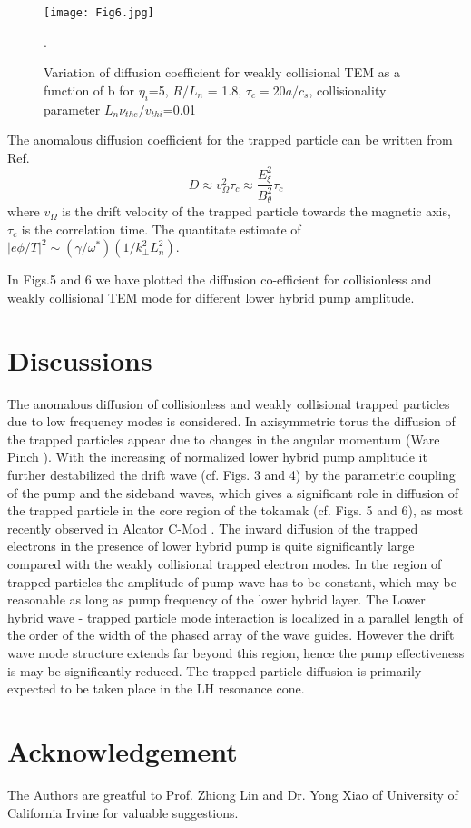 \documentclass[aip,pop,amsmath,amssymb,showpacs,reprint,floatfix,lengthcheck]{revtex4-1}
\begin{document}
\begin{figure}
 \centering
 \texttt{[image: Fig6.jpg]}
 \caption{Variation of diffusion coefficient for weakly collisional TEM as a function of b for $\eta_{i}$=5, $R/L_{n}$ = 1.8, $\tau_{c}=20a/c_{s}$, collisionality parameter $L_{n}\nu_{the}/v_{thi}$=0.01}.
 \label{fig:6}
\end{figure}
The anomalous diffusion coefficient for the trapped particle can be written from Ref. \cite{PhysRevLett.26.621}
\begin{equation}
 D \approx  v_{\Omega}^2\tau_{c} \approx\frac{E_{\xi}^2}{B_{\theta}^2}\tau_{c}
\end{equation}
where $v_{\Omega}$ is the drift velocity of the trapped particle towards the magnetic axis, $\tau_{c}$ is the correlation time. The quantitate estimate of $\lvert {e\phi}/{T}\rvert^2 \sim ({\gamma}/{\omega^*})({1}/{k_{\perp}^2L_{n}^2})$.

In Figs.5 and 6 we have plotted the diffusion co-efficient for collisionless and weakly collisional TEM mode for different lower hybrid pump amplitude.
\section{Discussions}
 The anomalous diffusion of collisionless and weakly collisional trapped particles  due to low frequency modes is considered. In axisymmetric torus the diffusion of the trapped particles appear due to changes in the angular momentum (Ware Pinch \cite{PhysRevLett.25.15}). With the increasing of normalized lower hybrid pump amplitude it further destabilized the drift wave (cf. Figs. 3 and 4) by the parametric coupling of the pump and the sideband waves, which gives a significant role in diffusion of the trapped particle in the core region of the tokamak (cf. Figs. 5 and 6), as most recently observed in Alcator C-Mod \cite{PhysRevLett.102.035002,rice2009observations}. The inward diffusion of the trapped electrons in the presence of lower hybrid pump is quite significantly large compared with the weakly collisional trapped electron modes.
In the region of trapped particles the amplitude of pump wave has to be constant, which may be reasonable as long as pump frequency of the lower hybrid layer. The Lower hybrid wave - trapped particle mode interaction is localized in a parallel length of the order of the width of the phased array of the wave guides. However the drift wave mode structure extends far beyond this region, hence the pump effectiveness is may be significantly reduced. The trapped particle diffusion is primarily expected to be taken place in the LH resonance cone.
\section{Acknowledgement}
The Authors are greatful to  Prof. Zhiong Lin and Dr. Yong Xiao of University of California Irvine for valuable suggestions.























\nocite{*}
\end{document}
